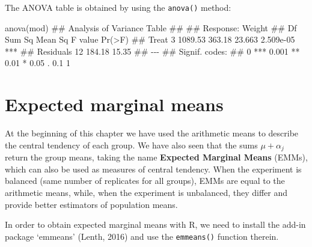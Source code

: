 \documentclass[a4paper,12pt,oneside]{book}
\newenvironment{Shaded}{\begin{snugshade}}{\end{snugshade}}
\newcommand{\DocumentationTok}[1]{#1}
\newcommand{\FunctionTok}[1]{#1}
\newcommand{\NormalTok}[1]{#1}
\begin{document}
The ANOVA table is obtained by using the \texttt{anova()} method:

\vspace{12pt}

\begin{Shaded}
\begin{Highlighting}[]
\FunctionTok{anova}\NormalTok{(mod)}
\DocumentationTok{\#\# Analysis of Variance Table}
\DocumentationTok{\#\# }
\DocumentationTok{\#\# Response: Weight}
\DocumentationTok{\#\#           Df  Sum Sq Mean Sq F value    Pr(\textgreater{}F)    }
\DocumentationTok{\#\# Treat      3 1089.53  363.18  23.663 2.509e{-}05 ***}
\DocumentationTok{\#\# Residuals 12  184.18   15.35                      }
\DocumentationTok{\#\# {-}{-}{-}}
\DocumentationTok{\#\# Signif. codes:  }
\DocumentationTok{\#\# 0 \textquotesingle{}***\textquotesingle{} 0.001 \textquotesingle{}**\textquotesingle{} 0.01 \textquotesingle{}*\textquotesingle{} 0.05 \textquotesingle{}.\textquotesingle{} 0.1 \textquotesingle{} \textquotesingle{} 1}
\end{Highlighting}
\end{Shaded}

\hypertarget{expected-marginal-means}{%
\section{Expected marginal means}\label{expected-marginal-means}}

At the beginning of this chapter we have used the arithmetic means to describe the central tendency of each group. We have also seen that the sums \(\mu + \alpha_j\) return the group means, taking the name \textbf{Expected Marginal Means} (EMMs), which can also be used as measures of central tendency. When the experiment is balanced (same number of replicates for all groups), EMMs are equal to the arithmetic means, while, when the experiment is unbalanced, they differ and provide better estimators of population means.

In order to obtain expected marginal means with R, we need to install the add-in package `emmeans' (Lenth, 2016) and use the \texttt{emmeans()} function therein.

\vspace{12pt}
\end{document}
